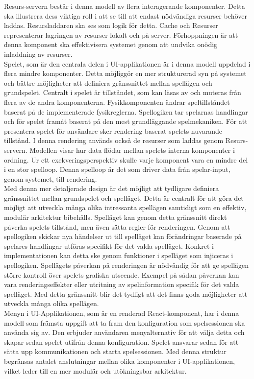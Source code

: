 Resurs-servern består i denna modell av flera interagerande komponenter. Detta ska illustrera dess viktiga roll i att se till att endast nödvändiga resurser behöver laddas. Resursladdaren ska ses som logik för detta. Cache och Resurser representerar lagringen av resurser lokalt och på server. Förhoppningen är att denna komponent ska effektivisera systemet genom att undvika onödig inladdning av resurser.\\

Spelet, som är den centrala delen i UI-applikationen är i denna modell uppdelad i flera mindre komponenter. Detta möjliggör en mer strukturerad syn på systemet och bättre möjligheter att definiera gränssnittet mellan spellägen och grundspelet. Centralt i spelet är tillståndet, som kan läsas av och muteras från flera av de andra komponenterna. Fysikkomponenten ändrar speltillståndet baserat på de implementerade fysikreglerna. Spellogiken tar spelarnas handlingar och för spelet framåt baserat på den mest grundläggande spelmekaniken. För att presentera spelet för användare sker rendering baserat spelets nuvarande tillstånd. I denna rendering används också de resurser som laddas genom Resurs-servern. Modellen visar hur data flödar mellan spelets interna komponenter i ordning. Ur ett exekveringsperspektiv skulle varje komponent vara en mindre del i en stor spelloop. Denna spelloop är det som driver data från spelar-input, genom systemet, till rendering.\\

Med denna mer detaljerade design är det möjligt att tydligare definiera gränssnittet mellan grundspelet och spelläget. Detta är centralt för att göra det möjligt att utveckla många olika intressanta spellägen samtidigt som en effektiv, modulär arkitektur bibehålls. Spelläget kan genom detta gränssnitt direkt påverka spelets tillstånd, men även sätta regler för renderingen. Genom att spellogiken skickar nya händelser ut till spelläget kan förändringar baserade på spelares handlingar utföras specifikt för det valda spelläget. Konkret i implementationen kan detta ske genom funktioner i spelläget som injiceras i spellogiken. Spellägets påverkan på renderingen är nödvändig för att ge spellägen större kontroll över spelets grafiska utseende. Exempel på sådan påverkan kan vara renderingseffekter eller utritning av spelinformation specifik för det valda spelläget. Med detta gränssnitt blir det tydligt att det finns goda möjligheter att utveckla många olika spellägen.\\

Menyn i UI-Applikationen, som är en renderad React-komponent, har i denna modell som främsta uppgift att ta fram den konfiguration som spelsessionen ska använda sig av. Den erbjuder användaren menyalternativ för att välja detta och skapar sedan spelet utifrån denna konfiguration. Spelet ansvarar sedan för att sätta upp kommunikationen och starta spelsessionen. Med denna struktur begränsas antalet anslutningar mellan olika komponenter i UI-applikationen, vilket leder till en mer modulär och utökningsbar arkitektur.\\

